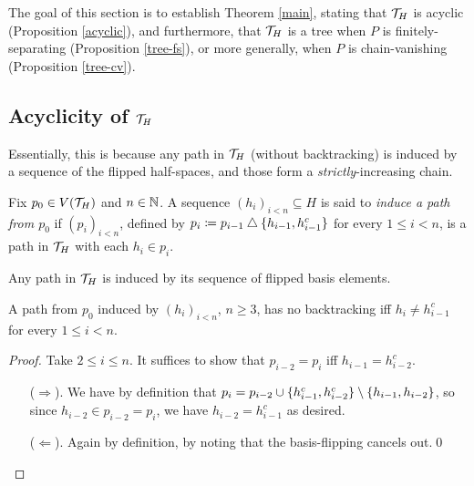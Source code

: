 \documentclass{amsart}
\begin{document}
    The goal of this section is to establish Theorem \ref{main}, stating that $\mathcal{T}_H$ is acyclic (Proposition \ref{acyclic}), and furthermore, that $\mathcal{T}_H$ is a tree when $P$ is finitely-separating (Proposition \ref{tree-fs}), or more generally, when $P$ is chain-vanishing (Proposition \ref{tree-cv}).

    \subsection{Acyclicity of $\mathcal{T}_H$}

    Essentially, this is because any path in $\mathcal{T}_H$ (without backtracking) is induced by a sequence of the flipped half-spaces, and those form a \textit{strictly}-increasing chain.

    \begin{definition}
        Fix $p_0\in V(\mathcal{T}_H)$ and $n\in\mathbb{N}$. A sequence $(h_i)_{i<n}\subseteq H$ is said to \textit{induce a path from $p_0$} if $(p_i)_{i<n}$, defined by $p_i\coloneqq p_{i-1}\bigtriangleup\{h_{i-1},h_{i-1}^c\}$ for every $1\leq i<n$, is a path in $\mathcal{T}_H$ with each $h_i\in p_i$.
    \end{definition}

    \begin{remark}
        Any path in $\mathcal{T}_H$ is induced by its sequence of flipped basis elements.
    \end{remark}

    \begin{lemma}\label{no-backtrack}
        A path from $p_0$ induced by $(h_i)_{i<n}$, $n\geq3$, has no backtracking iff $h_i\neq h_{i-1}^c$ for every $1\leq i<n$.
    \end{lemma}
    \begin{proof}
        Take $2\leq i\leq n$. It suffices to show that $p_{i-2}=p_i$ iff $h_{i-1}=h_{i-2}^c$.
        \begin{itemize}
            \item[($\Rightarrow$).] We have by definition that $p_i=p_{i-2}\cup\{h_{i-1}^c,h_{i-2}^c\}\setminus\left\{h_{i-1},h_{i-2}\right\}$, so since $h_{i-2}\in p_{i-2}=p_i$, we have $h_{i-2}=h_{i-1}^c$ as desired.
            \item[($\Leftarrow$).] Again by definition, by noting that the basis-flipping cancels out.\qed
        \end{itemize}
    \end{proof}
\end{document}

